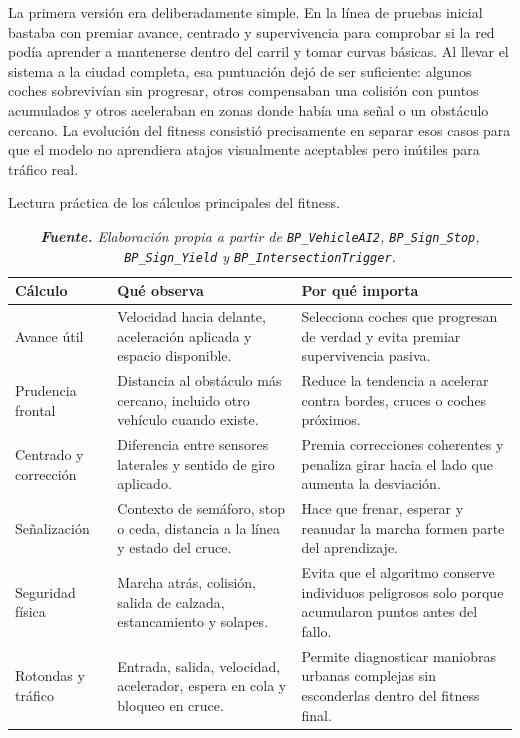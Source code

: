 La primera versión era deliberadamente simple. En la línea de pruebas inicial bastaba con premiar avance, centrado y supervivencia para comprobar si la red podía aprender a mantenerse dentro del carril y tomar curvas básicas. Al llevar el sistema a la ciudad completa, esa puntuación dejó de ser suficiente: algunos coches sobrevivían sin progresar, otros compensaban una colisión con puntos acumulados y otros aceleraban en zonas donde había una señal o un obstáculo cercano. La evolución del fitness consistió precisamente en separar esos casos para que el modelo no aprendiera atajos visualmente aceptables pero inútiles para tráfico real.

\begin{table}[H]
\centering
\caption{Lectura práctica de los cálculos principales del fitness.}%
\label{tab:componentes-fitness}
\begin{tabularx}{0.98\textwidth}{L{2.7cm}L{4.1cm}X}
\toprule
\textbf{Cálculo} & \textbf{Qué observa} & \textbf{Por qué importa}\\
\midrule
Avance útil & Velocidad hacia delante, aceleración aplicada y espacio disponible. & Selecciona coches que progresan de verdad y evita premiar supervivencia pasiva.\\
Prudencia frontal & Distancia al obstáculo más cercano, incluido otro vehículo cuando existe. & Reduce la tendencia a acelerar contra bordes, cruces o coches próximos.\\
Centrado y corrección & Diferencia entre sensores laterales y sentido de giro aplicado. & Premia correcciones coherentes y penaliza girar hacia el lado que aumenta la desviación.\\
Señalización & Contexto de semáforo, stop o ceda, distancia a la línea y estado del cruce. & Hace que frenar, esperar y reanudar la marcha formen parte del aprendizaje.\\
Seguridad física & Marcha atrás, colisión, salida de calzada, estancamiento y solapes. & Evita que el algoritmo conserve individuos peligrosos solo porque acumularon puntos antes del fallo.\\
Rotondas y tráfico & Entrada, salida, velocidad, acelerador, espera en cola y bloqueo en cruce. & Permite diagnosticar maniobras urbanas complejas sin esconderlas dentro del fitness final.\\
\bottomrule
\end{tabularx}
\caption*{\textit{\textbf{Fuente.} Elaboración propia a partir de \texttt{BP\_VehicleAI2}, \texttt{BP\_Sign\_Stop}, \texttt{BP\_Sign\_Yield} y \texttt{BP\_IntersectionTrigger}.}}
\end{table}

